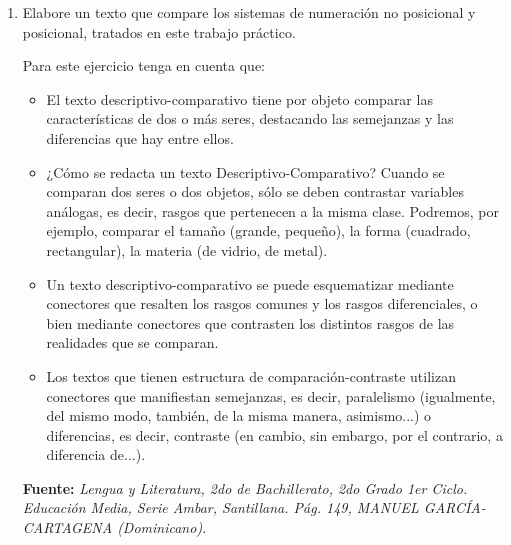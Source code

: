 \documentclass[12pt]{article}
\begin{document}
\begin{enumerate}
        \begin{enumerate}

            \item Elabore un texto que compare los sistemas de numeración no
                posicional y posicional, tratados en este trabajo
                práctico.

                Para este ejercicio tenga en cuenta que:

                \begin{itemize}

                    \item El texto descriptivo-comparativo tiene por objeto
                        comparar las características de dos o más seres,
                        destacando las semejanzas y las diferencias que hay
                        entre ellos.

                    \item ¿Cómo se redacta un texto Descriptivo-Comparativo?
                        Cuando se comparan dos seres o dos objetos, sólo se
                        deben contrastar variables análogas, es decir, rasgos
                        que pertenecen a la misma clase. Podremos, por
                        ejemplo, comparar el tamaño (grande, pequeño), la
                        forma (cuadrado, rectangular), la materia (de vidrio,
                        de metal).

                    \item Un texto descriptivo-comparativo se puede
                        esquematizar mediante conectores que resalten los
                        rasgos comunes y los rasgos diferenciales, o bien
                        mediante conectores que contrasten los distintos
                        rasgos de las realidades que se comparan.

                    \item Los textos que tienen estructura de
                        comparación-contraste utilizan conectores que
                        manifiestan semejanzas, es decir, paralelismo
                        (igualmente, del mismo modo, también, de la misma
                        manera, asimismo...) o diferencias, es decir,
                        contraste (en cambio, sin embargo, por el contrario, a
                        diferencia de...).

                \end{itemize}

                \textbf{Fuente:} \emph{Lengua y Literatura, 2do de
                Bachillerato, 2do Grado 1er Ciclo. Educación Media, Serie
                Ambar, Santillana. Pág. 149, MANUEL GARCÍA-CARTAGENA
                (Dominicano).}

    \end{enumerate}

\end{enumerate}
\end{document}
